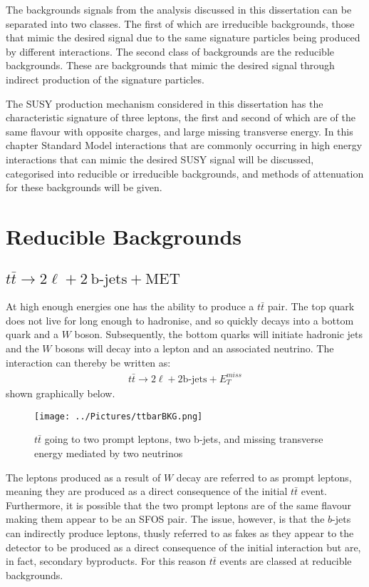 The backgrounds signals from the analysis discussed in this dissertation can be separated into two classes.
The first of which are irreducible backgrounds, those that mimic the desired signal due to the same signature particles being produced by different interactions.
The second class of backgrounds are the reducible backgrounds.
These are backgrounds that mimic the desired signal through indirect production of the signature particles. 

The SUSY production mechanism considered in this dissertation has the characteristic signature of three leptons, the first and second of which are of the same flavour with opposite charges, and large missing transverse energy.
In this chapter Standard Model interactions that are commonly occurring in high energy interactions that can mimic the desired SUSY signal will be discussed, categorised into reducible or irreducible backgrounds, and methods of attenuation for these backgrounds will be given.

\section{Reducible Backgrounds}
\subsection{$t\bar{t} \rightarrow 2\ell + 2\ \textrm{b-jets} + \textrm{MET}$} \label{subsec:ttbar}
At high enough energies one has the ability to produce a $t\bar{t}$ pair.
The top quark does not live for long enough to hadronise, and so quickly decays into a bottom quark and a $W$ boson.
Subsequently, the bottom quarks will initiate hadronic jets and the $W$ bosons will decay into a lepton and an associated neutrino.
The interaction can thereby be written as:
\begin{align}
t\bar{t} \rightarrow 2\ell  + 2\textrm{b-jets} + E_{T}^{miss}
\end{align}
shown graphically below.
\begin{figure}[htbp] %
   \centering
   \texttt{[image: ../Pictures/ttbarBKG.png]} 
   \caption{$t\bar{t}$ going to two prompt leptons, two b-jets, and missing transverse energy mediated by two neutrinos}
   \label{fig:example}
\end{figure}

\noindent The leptons produced as a result of $W$ decay are referred to as prompt leptons, meaning they are produced as a direct consequence of the initial $t\bar{t}$ event.
Furthermore, it is possible that the two prompt leptons are of the same flavour making them appear to be an SFOS pair.
The issue, however, is that the $b$-jets can indirectly produce leptons, thusly referred to as fakes as they appear to the detector to be produced as a direct consequence of the initial interaction but are, in fact, secondary byproducts. 
For this reason $t\bar{t}$ events are classed at reducible backgrounds.

